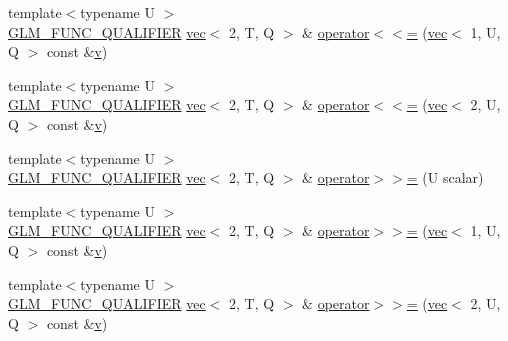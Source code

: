 \begin{DoxyCompactItemize}
{\footnotesize template$<$typename U $>$ }\\\mbox{\hyperlink{setup_8hpp_a33fdea6f91c5f834105f7415e2a64407}{G\+L\+M\+\_\+\+F\+U\+N\+C\+\_\+\+Q\+U\+A\+L\+I\+F\+I\+ER}} \mbox{\hyperlink{structglm_1_1vec}{vec}}$<$ 2, T, Q $>$ \& \mbox{\hyperlink{structglm_1_1vec_3_012_00_01_t_00_01_q_01_4_a4423f3d6021ce069241999d4e7829c9d}{operator$<$$<$=}} (\mbox{\hyperlink{structglm_1_1vec}{vec}}$<$ 1, U, Q $>$ const \&\mbox{\hyperlink{_s_d_l__opengl_8h_a10a82eabcb59d2fcd74acee063775f90}{v}})
\item 
{\footnotesize template$<$typename U $>$ }\\\mbox{\hyperlink{setup_8hpp_a33fdea6f91c5f834105f7415e2a64407}{G\+L\+M\+\_\+\+F\+U\+N\+C\+\_\+\+Q\+U\+A\+L\+I\+F\+I\+ER}} \mbox{\hyperlink{structglm_1_1vec}{vec}}$<$ 2, T, Q $>$ \& \mbox{\hyperlink{structglm_1_1vec_3_012_00_01_t_00_01_q_01_4_a3bbdd09fd3976b858078dc1157cecf19}{operator$<$$<$=}} (\mbox{\hyperlink{structglm_1_1vec}{vec}}$<$ 2, U, Q $>$ const \&\mbox{\hyperlink{_s_d_l__opengl_8h_a10a82eabcb59d2fcd74acee063775f90}{v}})
\item 
{\footnotesize template$<$typename U $>$ }\\\mbox{\hyperlink{setup_8hpp_a33fdea6f91c5f834105f7415e2a64407}{G\+L\+M\+\_\+\+F\+U\+N\+C\+\_\+\+Q\+U\+A\+L\+I\+F\+I\+ER}} \mbox{\hyperlink{structglm_1_1vec}{vec}}$<$ 2, T, Q $>$ \& \mbox{\hyperlink{structglm_1_1vec_3_012_00_01_t_00_01_q_01_4_aece22b772eb31903dd637c069c2aee82}{operator$>$$>$=}} (U scalar)
\item 
{\footnotesize template$<$typename U $>$ }\\\mbox{\hyperlink{setup_8hpp_a33fdea6f91c5f834105f7415e2a64407}{G\+L\+M\+\_\+\+F\+U\+N\+C\+\_\+\+Q\+U\+A\+L\+I\+F\+I\+ER}} \mbox{\hyperlink{structglm_1_1vec}{vec}}$<$ 2, T, Q $>$ \& \mbox{\hyperlink{structglm_1_1vec_3_012_00_01_t_00_01_q_01_4_a9831eed973635e3d4cea367592355f63}{operator$>$$>$=}} (\mbox{\hyperlink{structglm_1_1vec}{vec}}$<$ 1, U, Q $>$ const \&\mbox{\hyperlink{_s_d_l__opengl_8h_a10a82eabcb59d2fcd74acee063775f90}{v}})
\item 
{\footnotesize template$<$typename U $>$ }\\\mbox{\hyperlink{setup_8hpp_a33fdea6f91c5f834105f7415e2a64407}{G\+L\+M\+\_\+\+F\+U\+N\+C\+\_\+\+Q\+U\+A\+L\+I\+F\+I\+ER}} \mbox{\hyperlink{structglm_1_1vec}{vec}}$<$ 2, T, Q $>$ \& \mbox{\hyperlink{structglm_1_1vec_3_012_00_01_t_00_01_q_01_4_a7ef73d8384eeb47fd2a2afbd897cb06a}{operator$>$$>$=}} (\mbox{\hyperlink{structglm_1_1vec}{vec}}$<$ 2, U, Q $>$ const \&\mbox{\hyperlink{_s_d_l__opengl_8h_a10a82eabcb59d2fcd74acee063775f90}{v}})
\end{DoxyCompactItemize}
